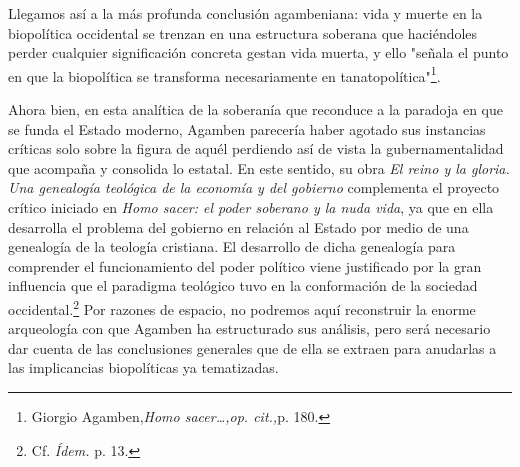 \documentclass{book}
\begin{document}
Llegamos así a la más profunda conclusión agambeniana: vida y muerte en
la biopolítica occidental se trenzan en una estructura soberana que
haciéndoles perder cualquier significación concreta gestan vida muerta,
y ello "señala el punto en que la biopolítica se transforma
necesariamente en tanatopolítica"\footnote{Giorgio Agamben,\emph{Homo
  sacer\ldots,op. cit.,}p. 180.}.

Ahora bien, en esta analítica de la soberanía que reconduce a la
paradoja en que se funda el Estado moderno, Agamben parecería haber
agotado sus instancias críticas solo sobre la figura de aquél perdiendo
así de vista la gubernamentalidad que acompaña y consolida lo estatal.
En este sentido, su obra \emph{El reino y la gloria. Una genealogía
teológica de la economía y del gobierno} complementa el proyecto crítico
iniciado en \emph{Homo sacer: el poder soberano y la nuda vida}, ya que
en ella desarrolla el problema del gobierno en relación al Estado por
medio de una genealogía de la teología cristiana. El desarrollo de dicha
genealogía para comprender el funcionamiento del poder político viene
justificado por la gran influencia que el paradigma teológico tuvo en la
conformación de la sociedad occidental.\footnote{Cf. \emph{Ídem.} p. 13.}
Por razones de espacio, no podremos aquí reconstruir la enorme
arqueología con que Agamben ha estructurado sus análisis, pero será
necesario dar cuenta de las conclusiones generales que de ella se
extraen para anudarlas a las implicancias biopolíticas ya tematizadas.
\end{document}
